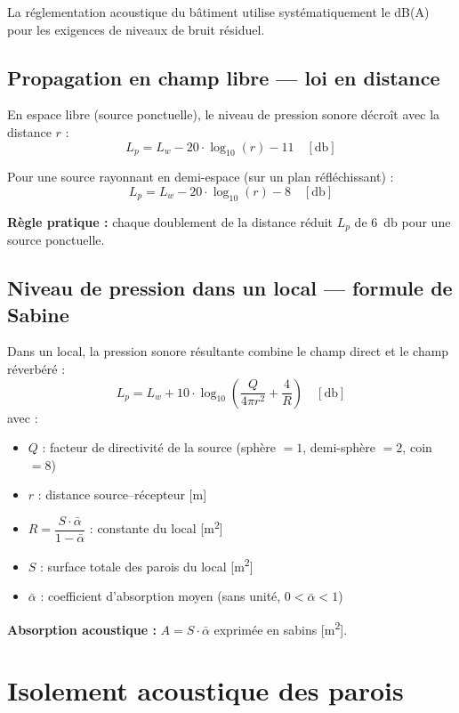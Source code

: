 La réglementation acoustique du bâtiment utilise systématiquement le dB(A) pour les exigences de niveaux de bruit résiduel.

\subsection{Propagation en champ libre — loi en distance}

En espace libre (source ponctuelle), le niveau de pression sonore décroît avec la distance $r$ :
\[
  L_p = L_w - 20 \cdot \log_{10}(r) - 11 \quad [\si{\decibel}]
\]

Pour une source rayonnant en demi-espace (sur un plan réfléchissant) :
\[
  L_p = L_w - 20 \cdot \log_{10}(r) - 8 \quad [\si{\decibel}]
\]

\begin{methode}
\textbf{Règle pratique :} chaque doublement de la distance réduit $L_p$ de 6~\si{\decibel} pour une source ponctuelle.
\end{methode}

\subsection{Niveau de pression dans un local — formule de Sabine}

Dans un local, la pression sonore résultante combine le champ direct et le champ réverbéré :
\[
  L_p = L_w + 10 \cdot \log_{10}\!\left(\frac{Q}{4\pi r^2} + \frac{4}{R}\right) \quad [\si{\decibel}]
\]
avec :
\begin{itemize}
  \item $Q$ : facteur de directivité de la source (sphère $= 1$, demi-sphère $= 2$, coin $= 8$)
  \item $r$ : distance source--récepteur [\si{\metre}]
  \item $R = \dfrac{S \cdot \bar{\alpha}}{1 - \bar{\alpha}}$ : constante du local [\si{\metre\squared}]
  \item $S$ : surface totale des parois du local [\si{\metre\squared}]
  \item $\bar{\alpha}$ : coefficient d'absorption moyen (sans unité, $0 < \bar{\alpha} < 1$)
\end{itemize}

\textbf{Absorption acoustique :} $A = S \cdot \bar{\alpha}$ exprimée en sabins [\si{\metre\squared}].

\section{Isolement acoustique des parois}

